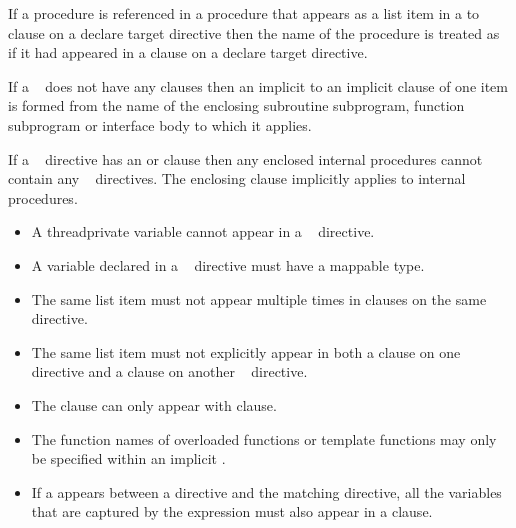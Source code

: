 \begin{fortranspecific}
If a procedure is referenced in a procedure that appears as a list item in a to
clause on a declare target directive then the name of the procedure is treated
as if it had appeared in a  clause on a declare target directive.

If a ~ does not have any clauses then an implicit
 to an implicit  clause of one item is formed from
the name of the enclosing subroutine subprogram, function subprogram or
interface body to which it applies.

If a ~ directive has an  or  clause
then any enclosed internal procedures cannot contain any ~ directives.
The enclosing  clause implicitly applies to internal procedures.
\end{fortranspecific}


\restrictions
\begin{itemize}
\item A threadprivate variable cannot appear in a
      ~ directive.

\item A variable declared in a ~ directive
      must have a mappable type.

\item The same list item must not appear multiple times in clauses on the same directive.

\item The same list item must not explicitly appear in both a  clause on one
~ directive and a  clause on
another ~ directive.

\item The  clause can only appear with  clause.

\end{itemize}

\begin{cppspecific}
\begin{itemize}
\item The function names of overloaded functions or template functions
may only be specified within an implicit .

\item If a  appears between a
   directive and the matching 
  directive, all the variables that are captured by the  expression
  must also appear in a  clause.
\end{itemize}
\end{cppspecific}

